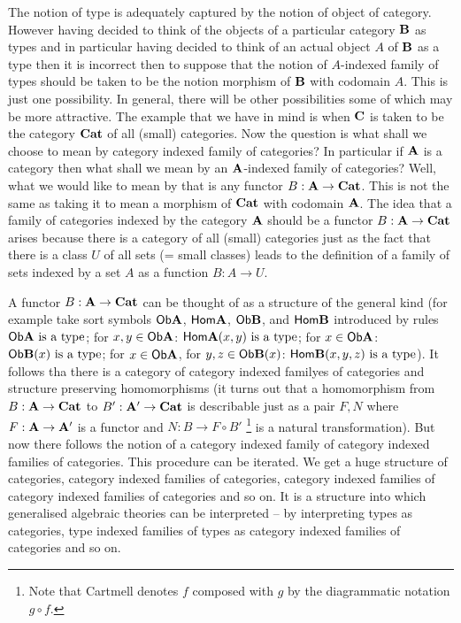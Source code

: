 The notion of type is adequately captured by the notion of object of category.
%
However having decided to think of the objects of a particular category $\mathbf{B}$ as types and in particular having decided to think of an actual object $A$ of $\mathbf{B}$ as a type then it is incorrect then to suppose that the notion of $A$-indexed family of types should be taken to be the notion morphism of $\mathbf{B}$ with codomain $A$.
%
This is just one possibility. In general, there will be other possibilities some of which may be more attractive.
%
The example that we have in mind is when $\mathbf{C}$ is taken to be the category $\mathbf{Cat}$ of all (small) categories.
%
Now the question is what shall we choose to mean by category indexed family of categories? In particular if $\mathbf{A}$ is a category then what shall we mean by an $\mathbf{A}$-indexed family of categories?
%
Well, what we would like to mean by that is any functor $B:\mathbf{A}\to\mathbf{Cat}$. This is not the same as taking it to mean a morphism of $\mathbf{Cat}$ with codomain $\mathbf{A}$.
%
The idea that a family of categories indexed by the category $\mathbf{A}$ should be a functor $B:\mathbf{A}\to\mathbf{Cat}$ arises because there is a category of all (small) categories just as the fact that there is a class $U$ of all sets (= small classes) leads to the definition of a family of sets indexed by a set $A$ as a function $B:A\to U$.


A functor $B:\mathbf{A}\to\mathbf{Cat}$ can be thought of as a structure of the general kind (for example take sort symbols $\mathsf{Ob}\mathbf{A}$, $\mathsf{Hom}\mathbf{A}$, $\mathsf{Ob}\mathbf{B}$, and $\mathsf{Hom}\mathbf{B}$ introduced by rules $\mathsf{Ob}\mathbf{A}\text{ is a type}$; for $x,y\in \mathsf{Ob}\mathbf{A}$: $\mathsf{Hom}\mathbf{A}(x,y)\text{ is a type}$; for $x\in \mathsf{Ob}\mathbf{A}$: $\mathsf{Ob}\mathbf{B}(x)\text{ is a type}$; for $x\in\mathsf{Ob}\mathbf{A}$, for $y,z\in\mathsf{Ob}\mathbf{B}(x)$: $\mathsf{Hom}\mathbf{B}(x,y,z)\text{ is a type}$).
%
It follows tha there is a category of category indexed familyes of categories and structure preserving homomorphisms (it turns out that a homomorphism from $B:\mathbf{A}\to\mathbf{Cat}$ to $B':\mathbf{A}'\to\mathbf{Cat}$ is describable just as a pair $F,N$ where $F:\mathbf{A}\to\mathbf{A}'$ is a functor and $N:B\to F\circ B'$ \footnote{Note that Cartmell denotes $f$ composed with $g$ by the diagrammatic notation $g\circ f$.} is a natural transformation).
%
But now there follows the notion of a category indexed family of category indexed families of categories.
%
This procedure can be iterated.
%
We get a huge structure of categories, category indexed families of categories, category indexed families of category indexed families of categories and so on.
%
It is a structure into which generalised algebraic theories can be interpreted -- by interpreting types as categories, type indexed families of types as category indexed families of categories and so on.


